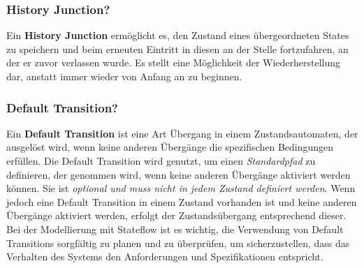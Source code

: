 \documentclass{article}
\begin{document}
\begin{multicols}{2}
			\subsubsection{History Junction?}
				Ein \textbf{History Junction} ermöglicht es, den Zustand eines übergeordneten States zu speichern und beim erneuten Eintritt in diesen an der Stelle fortzufahren, an der er zuvor verlassen wurde. Es stellt eine Möglichkeit der Wiederherstellung dar, anstatt immer wieder von Anfang an zu beginnen.
			\subsubsection{Default Transition?}
				Ein \textbf{Default Transition} ist eine Art Übergang in einem Zustandsautomaten, der ausgelöst wird, wenn keine anderen Übergänge die spezifischen Bedingungen erfüllen. Die Default Transition wird genutzt, um einen \textit{Standardpfad} zu definieren, der genommen wird, wenn keine anderen Übergänge aktiviert werden können.
				Sie ist \textit{optional und muss nicht in jedem Zustand definiert werden}. Wenn jedoch eine Default Transition in einem Zustand vorhanden ist und keine anderen Übergänge aktiviert werden, erfolgt der Zustandsübergang entsprechend dieser.
				Bei der Modellierung mit Stateflow ist es wichtig, die Verwendung von Default Transitions sorgfältig zu planen und zu überprüfen, um sicherzustellen, dass das Verhalten des Systems den Anforderungen und Spezifikationen entspricht.

\end{multicols}
\end{document}
